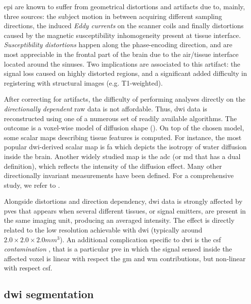 \Gls{epi} are known to suffer from geometrical distortions and artifacts
due to, mainly, three sources: the subject motion in between acquiring 
different sampling directions, the induced \emph{Eddy currents} on the scanner 
coils and finally distortions caused by the magnetic susceptibility inhomogeneity
present at tissue interface. \emph{Susceptibility distortions} happen along the 
phase-encoding direction, and are most appreciable in the frontal part of 
the brain due to the air/tissue interface located around the sinuses.
Two implications are associated to this artifact: the signal loss caused on
highly distorted regions, and a significant added difficulty in 
registering with structural images (e.g. T1-weighted).

After correcting for artifacts, the difficulty of performing analyses directly
on the \emph{directionally dependent} raw data is not affordable. Thus, 
\gls{dwi} data is reconstructed using one of a numerous set of readily 
available algorithms. The outcome is a voxel-wise model of diffusion shape 
(). On top of the
chosen model, some scalar maps describing tissue features is
computed. For instance, the most popular \gls{dwi}-derived scalar map 
is \gls{fa} which depicts the isotropy of water diffusion inside the brain.
Another widely studied map is the \gls{adc} (or \gls{md} that has a dual definition),
which reflects the intensity of the diffusion effect. Many other
directionally invariant measurements have been defined. For a comprehensive study, 
we refer to \citep{ennis_orthogonal_2006}.

Alongside distortions and direction dependency, \gls{dwi} data is strongly 
affected by \glspl{pve} \citep{alexander_analysis_2001} that appears when
several different tissues, or signal 
emitters, are present in the same imaging unit, producing an averaged intensity. 
The effect is directly related to the low resolution achievable with \gls{dwi} 
(typically around $2.0\times2.0\times2.0mm^3$). An additional complication specific to
\gls{dwi} is the \gls{csf} \emph{contamination} \citep{metzler-baddeley_how_2012},
that is a particular \gls{pve} in which the signal sensed inside the affected voxel is 
linear with respect the \gls{gm} and \gls{wm} contributions, but non-linear with
respect \gls{csf}.


\subsection{\Gls{dwi} segmentation}
\label{sec:dwi_segmentation}

